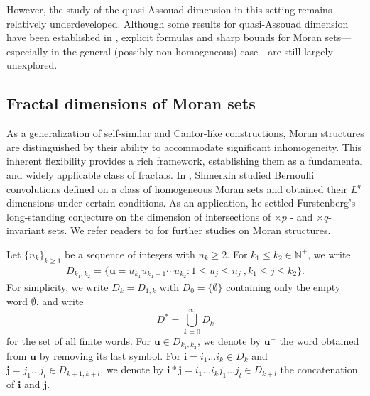 \documentclass[12pt]{amsart}
\numberwithin{equation}{section}
\theoremstyle{plain}
\theoremstyle{remark}
\theoremstyle{definition}
\newcommand{\N}{\mathbb{N}}
\newcommand{\iii}{\mathbf{i}}
\newcommand{\jjj}{\mathbf{j}}
\newcommand{\bu}{\mathbf{u}}
\renewcommand{\le}{\leqslant}
\renewcommand{\geq}{\geqslant}
\renewcommand{\leq}{\leqslant}
\begin{document}
However, the study of the quasi-Assouad dimension in this setting remains relatively underdeveloped. Although some results for quasi-Assouad dimension have been established in \cite{lu2016quasi,garcia2021}, explicit formulas and sharp bounds for Moran sets—especially in the general (possibly non-homogeneous) case—are still largely unexplored. 


	\subsection{Fractal dimensions of Moran sets }\label{cond}			
As a generalization of self-similar and Cantor-like constructions, Moran structures are distinguished by their ability to accommodate significant inhomogeneity. This inherent flexibility provides a rich framework, establishing them as a fundamental and widely applicable class of fractals. In \cite{Shmerkin}, Shmerkin  studied Bernoulli convolutions defined on a class of homogeneous Moran sets and obtained their $L^q$ dimensions under certain conditions. As an application, he settled Furstenberg's long-standing conjecture on the dimension of intersections of $\times p$ - and $\times q$-invariant sets.  We refer readers to \cite{Multi,hua2000structures,local,MW26,GM1,GM2} for further studies on Moran structures.
	
	
	Let $\{n_{k}\}_{k\geq 1}$ be a sequence of integers with $n_k\geq 2.$ For $k_1\leq k_2\in \N^+$, we write
	\begin{gather*}
		D_{k_1,k_2}=\{\bu=u_{k_1}u_{k_1+1}\cdots u_{k_2}:1\leq u_{j}\leq
		n_{j}\ , k_1\le j\le k_2\}.
	\end{gather*}
	For simplicity, we write $	D_{k}= D_{1,k}$   with $
	D_{0}=\{\emptyset \}$ containing only the empty word $\emptyset$, and write
	$$
	D^{*}=\bigcup _{k=0}^{\infty }D_{k}
	$$
	for the set of all finite words. For $\bu \in D_{k_1,k_2}$, we denote by $\bu^-$ the word obtained from $\bu$ by removing its last symbol. For $\iii=i_1\ldots i_k \in D_k$ and $\jjj=j_1\ldots j_l\in D_{k+1,k+l}$, we denote by $\iii*\jjj=i_1\ldots i_kj_1\ldots j_l\in D_{k+l}$ the concatenation of $\iii$ and $\jjj$.
 	
\end{document}
